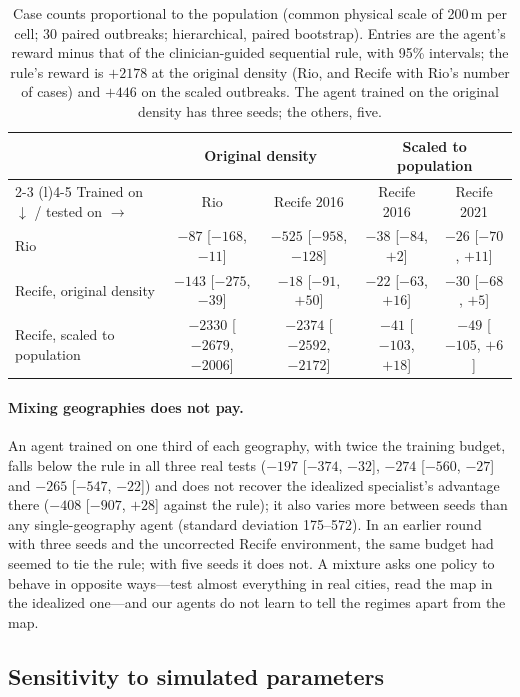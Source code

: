 \documentclass[11pt,a4paper]{article}
\begin{document}
\begin{table}[htbp]
\centering
\caption{Case counts proportional to the population (common physical scale of 200\,m per cell; 30 paired outbreaks; hierarchical, paired bootstrap). Entries are the agent's reward minus that of the clinician-guided sequential rule, with 95\% intervals; the rule's reward is $+2178$ at the original density (Rio, and Recife with Rio's number of cases) and $+446$ on the scaled outbreaks. The agent trained on the original density has three seeds; the others, five.}
\label{tab:popscale}
\small
\begin{tabular}{@{}lcccc@{}}
\toprule
 & \multicolumn{2}{c}{Original density} & \multicolumn{2}{c}{Scaled to population} \\
\cmidrule(lr){2-3} \cmidrule(l){4-5}
Trained on $\downarrow$ / tested on $\rightarrow$ & Rio & Recife 2016 & Recife 2016 & Recife 2021 \\ \midrule
Rio & $-87$ [$-168$, $-11$] & $-525$ [$-958$, $-128$] & $-38$ [$-84$, $+2$] & $-26$ [$-70$, $+11$] \\
Recife, original density & $-143$ [$-275$, $-39$] & $-18$ [$-91$, $+50$] & $-22$ [$-63$, $+16$] & $-30$ [$-68$, $+5$] \\
Recife, scaled to population & $-2330$ [$-2679$, $-2006$] & $-2374$ [$-2592$, $-2172$] & $-41$ [$-103$, $+18$] & $-49$ [$-105$, $+6$] \\ \bottomrule
\end{tabular}
\end{table}

\paragraph{Mixing geographies does not pay.} An agent trained on one third of each geography, with twice the training budget, falls below the rule in all three real tests ($-197$ [$-374$, $-32$], $-274$ [$-560$, $-27$] and $-265$ [$-547$, $-22$]) and does not recover the idealized specialist's advantage there ($-408$ [$-907$, $+28$] against the rule); it also varies more between seeds than any single-geography agent (standard deviation 175--572). In an earlier round with three seeds and the uncorrected Recife environment, the same budget had seemed to tie the rule; with five seeds it does not. A mixture asks one policy to behave in opposite ways---test almost everything in real cities, read the map in the idealized one---and our agents do not learn to tell the regimes apart from the map.

\subsection{Sensitivity to simulated parameters}
\label{sec:res_sens}
\end{document}
